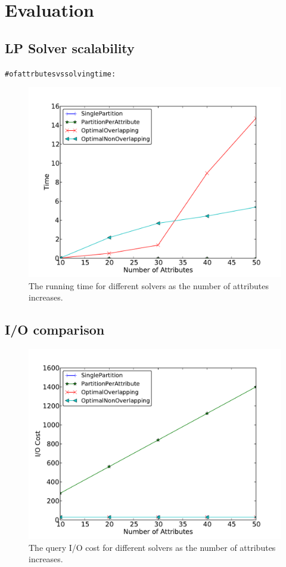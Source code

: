 \section{Evaluation}

\subsection{LP Solver scalability}
\begin{alltt}\scriptsize
# of attrbutes vs solving time:
\end{alltt}

\begin{figure}[t]
\centerline{\includegraphics[width=0.9\columnwidth]{figures/RunningTimeVsNumAttributes.pdf}}
\caption{The running time for different solvers as the number of attributes increases.}
\end{figure}



\subsection{I/O comparison}

\begin{figure}[t]
\centerline{\includegraphics[width=0.9\columnwidth]{figures/QueryIOVsNumAttributes.pdf}}
\caption{The query I/O cost for different solvers as the number of attributes increases.}
\end{figure}


